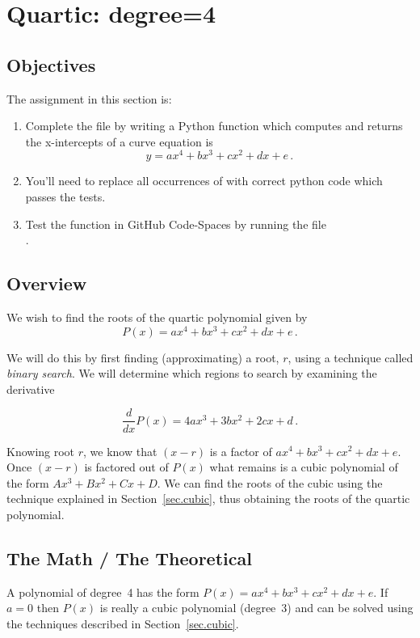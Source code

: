 \section{Quartic: degree=4}
\label{sec.quartic}

\subsection{Objectives}
The assignment in this section is:
\begin{enumerate}
\item Complete the file  by writing a Python
  function which computes and returns the x-intercepts of a curve
  equation is \[y=a x^4 + b x^3 + c x^2 + d x + e\,.\]
\item You'll need to replace all occurrences of  with correct python code which passes the
  tests.
\item Test the function in GitHub Code-Spaces by running the
  file\\ .
\end{enumerate}

\subsection{Overview}

We wish to find the roots of the quartic polynomial given by 
\[P(x) = ax^4 + b x^3 + c x^2 + d x + e\,.\]

We will do this by first finding (approximating) a root, $r$, using a
technique called \emph{binary search}.  We will determine which
regions to search by examining the derivative

\[\frac{d}{d x} P(x) = 4ax^3 + 3b x^2 + 2c x + d\,.\]

Knowing root $r$, we know that $(x-r)$ is a factor of
$a x^4 + b x^3 + c x^2 + d x + e$.  Once $(x-r)$ is factored out of $P(x)$ what remains
is a cubic polynomial of the form $A x^3 + B x^2 + C x + D$.  We can
find the roots of the cubic using the technique explained in
Section~\ref{sec.cubic}, thus obtaining the roots of the quartic
polynomial.


\subsection{The Math / The Theoretical}


A polynomial of degree~4 has the form $P(x) = a x^4 + b x^3 + c x^2 +
d x + e$. If $a=0$ then $P(x)$ is really a cubic polynomial (degree~3)
and can be solved using the techniques described in
Section~\ref{sec.cubic}.

